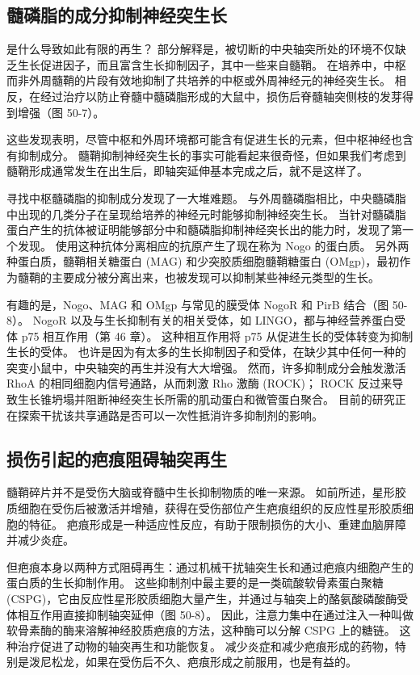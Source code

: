 \subsection{髓磷脂的成分抑制神经突生长}
是什么导致如此有限的再生？ 部分解释是，被切断的中央轴突所处的环境不仅缺乏生长促进因子，而且富含生长抑制因子，其中一些来自髓鞘。 在培养中，中枢而非外周髓鞘的片段有效地抑制了共培养的中枢或外周神经元的神经突生长。 相反，在经过治疗以防止脊髓中髓磷脂形成的大鼠中，损伤后脊髓轴突侧枝的发芽得到增强（图 50-7）。

这些发现表明，尽管中枢和外周环境都可能含有促进生长的元素，但中枢神经也含有抑制成分。 髓鞘抑制神经突生长的事实可能看起来很奇怪，但如果我们考虑到髓鞘形成通常发生在出生后，即轴突延伸基本完成之后，就不是这样了。

寻找中枢髓磷脂的抑制成分发现了一大堆难题。 与外周髓磷脂相比，中央髓磷脂中出现的几类分子在呈现给培养的神经元时能够抑制神经突生长。 当针对髓磷脂蛋白产生的抗体被证明能够部分中和髓磷脂抑制神经突长出的能力时，发现了第一个发现。 使用这种抗体分离相应的抗原产生了现在称为 Nogo 的蛋白质。 另外两种蛋白质，髓鞘相关糖蛋白 (MAG) 和少突胶质细胞髓鞘糖蛋白 (OMgp)，最初作为髓鞘的主要成分被分离出来，也被发现可以抑制某些神经元类型的生长。

有趣的是，Nogo、MAG 和 OMgp 与常见的膜受体 NogoR 和 PirB 结合（图 50-8）。 NogoR 以及与生长抑制有关的相关受体，如 LINGO，都与神经营养蛋白受体 p75 相互作用（第 46 章）。 这种相互作用将 p75 从促进生长的受体转变为抑制生长的受体。 也许是因为有太多的生长抑制因子和受体，在缺少其中任何一种的突变小鼠中，中央轴突的再生并没有大大增强。 然而，许多抑制成分会触发激活 RhoA 的相同细胞内信号通路，从而刺激 Rho 激酶 (ROCK)； ROCK 反过来导致生长锥坍塌并阻断神经突生长所需的肌动蛋白和微管蛋白聚合。 目前的研究正在探索干扰该共享通路是否可以一次性抵消许多抑制剂的影响。

\subsection{损伤引起的疤痕阻碍轴突再生}
髓鞘碎片并不是受伤大脑或脊髓中生长抑制物质的唯一来源。 如前所述，星形胶质细胞在受伤后被激活并增殖，获得在受伤部位产生疤痕组织的反应性星形胶质细胞的特征。 疤痕形成是一种适应性反应，有助于限制损伤的大小、重建血脑屏障并减少炎症。

但疤痕本身以两种方式阻碍再生：通过机械干扰轴突生长和通过疤痕内细胞产生的蛋白质的生长抑制作用。 这些抑制剂中最主要的是一类硫酸软骨素蛋白聚糖 (CSPG)，它由反应性星形胶质细胞大量产生，并通过与轴突上的酪氨酸磷酸酶受体相互作用直接抑制轴突延伸（图 50-8）。 因此，注意力集中在通过注入一种叫做软骨素酶的酶来溶解神经胶质疤痕的方法，这种酶可以分解 CSPG 上的糖链。 这种治疗促进了动物的轴突再生和功能恢复。 减少炎症和减少疤痕形成的药物，特别是泼尼松龙，如果在受伤后不久、疤痕形成之前服用，也是有益的。

